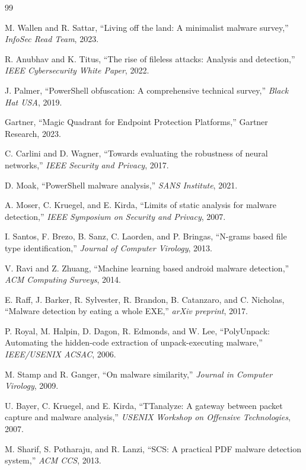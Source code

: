 \documentclass[10pt,conference,a4paper]{IEEEtran}
\begin{document}
\begin{thebibliography}{99}

 M. Wallen and R. Sattar, ``Living off the land: A minimalist malware survey,'' \textit{InfoSec Read Team}, 2023.

 R. Anubhav and K. Titus, ``The rise of fileless attacks: Analysis and detection,'' \textit{IEEE Cybersecurity White Paper}, 2022.

 J. Palmer, ``PowerShell obfuscation: A comprehensive technical survey,'' \textit{Black Hat USA}, 2019.

 Gartner, ``Magic Quadrant for Endpoint Protection Platforms,'' Gartner Research, 2023.

 C. Carlini and D. Wagner, ``Towards evaluating the robustness of neural networks,'' \textit{IEEE Security and Privacy}, 2017.

 D. Moak, ``PowerShell malware analysis,'' \textit{SANS Institute}, 2021.

 A. Moser, C. Kruegel, and E. Kirda, ``Limits of static analysis for malware detection,'' \textit{IEEE Symposium on Security and Privacy}, 2007.

 I. Santos, F. Brezo, B. Sanz, C. Laorden, and P. Bringas, ``N-grams based file type identification,'' \textit{Journal of Computer Virology}, 2013.

 V. Ravi and Z. Zhuang, ``Machine learning based android malware detection,'' \textit{ACM Computing Surveys}, 2014.

 E. Raff, J. Barker, R. Sylvester, R. Brandon, B. Catanzaro, and C. Nicholas, ``Malware detection by eating a whole EXE,'' \textit{arXiv preprint}, 2017.

 P. Royal, M. Halpin, D. Dagon, R. Edmonds, and W. Lee, ``PolyUnpack: Automating the hidden-code extraction of unpack-executing malware,'' \textit{IEEE/USENIX ACSAC}, 2006.

 M. Stamp and R. Ganger, ``On malware similarity,'' \textit{Journal in Computer Virology}, 2009.

 U. Bayer, C. Kruegel, and E. Kirda, ``TTanalyze: A gateway between packet capture and malware analysis,'' \textit{USENIX Workshop on Offensive Technologies}, 2007.

 M. Sharif, S. Potharaju, and R. Lanzi, ``SCS: A practical PDF malware detection system,'' \textit{ACM CCS}, 2013.


\end{thebibliography}
\end{document}
